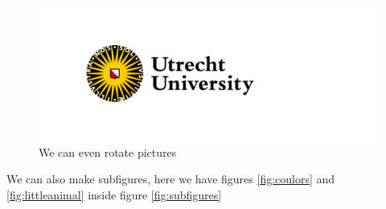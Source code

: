 \documentclass[thesis]{subfiles}
\begin{document}
\begin{figure}[b!]
    \includegraphics[scale = 0.9, angle = 31.4159]{uulogoEN.png}
    \caption{We can even rotate pictures}
    \label{fig:asbak}
\end{figure}
\clearpage

We can also make subfigures, here we have figures \ref{fig:coulors} and \ref{fig:littleanimal} inside figure \ref{fig:subfigures}
\end{document}
